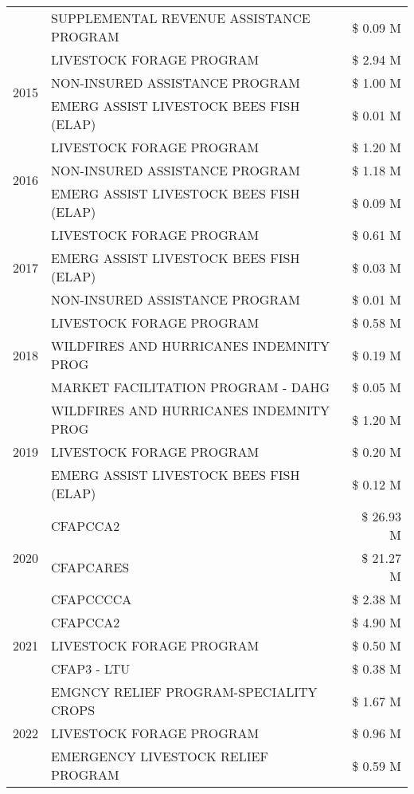 \begin{tabular}{llr}
 & SUPPLEMENTAL REVENUE ASSISTANCE PROGRAM & \$ 0.09 M \\
\cline{1-3}
\multirow[t]{3}{*}{2015} & LIVESTOCK FORAGE PROGRAM & \$ 2.94 M \\
 & NON-INSURED ASSISTANCE PROGRAM & \$ 1.00 M \\
 & EMERG ASSIST LIVESTOCK BEES FISH (ELAP) & \$ 0.01 M \\
\cline{1-3}
\multirow[t]{3}{*}{2016} & LIVESTOCK FORAGE PROGRAM & \$ 1.20 M \\
 & NON-INSURED ASSISTANCE PROGRAM & \$ 1.18 M \\
 & EMERG ASSIST LIVESTOCK BEES FISH (ELAP) & \$ 0.09 M \\
\cline{1-3}
\multirow[t]{3}{*}{2017} & LIVESTOCK FORAGE PROGRAM & \$ 0.61 M \\
 & EMERG ASSIST LIVESTOCK BEES FISH (ELAP) & \$ 0.03 M \\
 & NON-INSURED ASSISTANCE PROGRAM & \$ 0.01 M \\
\cline{1-3}
\multirow[t]{3}{*}{2018} & LIVESTOCK FORAGE PROGRAM & \$ 0.58 M \\
 & WILDFIRES AND HURRICANES INDEMNITY PROG & \$ 0.19 M \\
 & MARKET FACILITATION PROGRAM - DAHG & \$ 0.05 M \\
\cline{1-3}
\multirow[t]{3}{*}{2019} & WILDFIRES AND HURRICANES INDEMNITY PROG & \$ 1.20 M \\
 & LIVESTOCK FORAGE PROGRAM & \$ 0.20 M \\
 & EMERG ASSIST LIVESTOCK BEES FISH (ELAP) & \$ 0.12 M \\
\cline{1-3}
\multirow[t]{3}{*}{2020} & CFAPCCA2 & \$ 26.93 M \\
 & CFAPCARES & \$ 21.27 M \\
 & CFAPCCCCA & \$ 2.38 M \\
\cline{1-3}
\multirow[t]{3}{*}{2021} & CFAPCCA2 & \$ 4.90 M \\
 & LIVESTOCK FORAGE PROGRAM & \$ 0.50 M \\
 & CFAP3 - LTU & \$ 0.38 M \\
\cline{1-3}
\multirow[t]{3}{*}{2022} & EMGNCY RELIEF PROGRAM-SPECIALITY CROPS & \$ 1.67 M \\
 & LIVESTOCK FORAGE PROGRAM & \$ 0.96 M \\
 & EMERGENCY LIVESTOCK RELIEF PROGRAM & \$ 0.59 M \\
\cline{1-3}
\bottomrule
\end{tabular}
